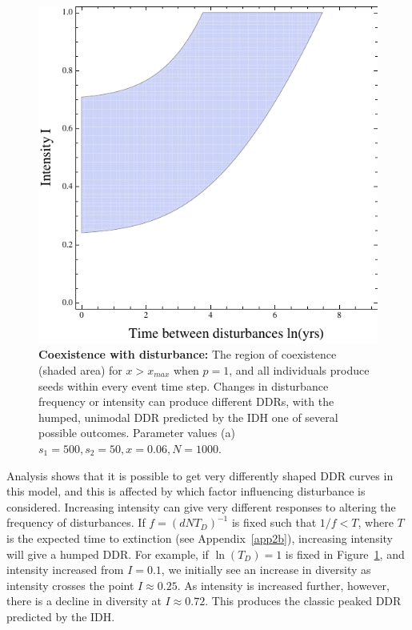 \begin{figure}[th]
\centering
  \includegraphics[width=5in]{hockeyTd.pdf}
   \caption[Coexistence with disturbance]{\textbf{Coexistence with disturbance: }The region of coexistence (shaded area) for $x>x_{max}$ when $p=1$, and all individuals produce seeds within every event time step. Changes in disturbance frequency or intensity can produce different DDRs, with the humped, unimodal DDR predicted by the IDH one of several possible outcomes. Parameter values (a) $s_1=500, s_2=50, x=0.06,N=1000$.}
 \label{hockey}
\end{figure}

Analysis shows that it is possible to get very differently shaped DDR curves in this model, and this is affected by which factor influencing disturbance is considered. Increasing intensity can give very different responses to altering the frequency of disturbances. If $f=(dNT_D)^{-1}$ is fixed such that $1/f<T$, where $T$ is the expected time to extinction (see Appendix~\ref{app2b}), increasing intensity will give a humped DDR. For example, if $\ln(T_D)=1$ is fixed in Figure~\ref{hockey}, and intensity increased from $I=0.1$, we initially see an increase in diversity as intensity crosses the point $I\approx0.25$. As intensity is increased further, however, there is a decline in diversity at $I\approx0.72$. This produces the classic peaked DDR predicted by the IDH.

